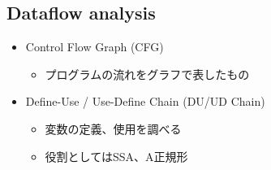 \subsection{Dataflow analysis}
\begin{frame}
	\frametitlesubs

	\begin{itemize}
		\item Control Flow Graph (CFG)
			\begin{itemize}
				\item プログラムの流れをグラフで表したもの
			\end{itemize}
		\item Define-Use / Use-Define Chain (DU/UD Chain)
			\begin{itemize}
				\item 変数の定義、使用を調べる
				\item 役割としてはSSA、A正規形
			\end{itemize}
	\end{itemize}
\end{frame}

